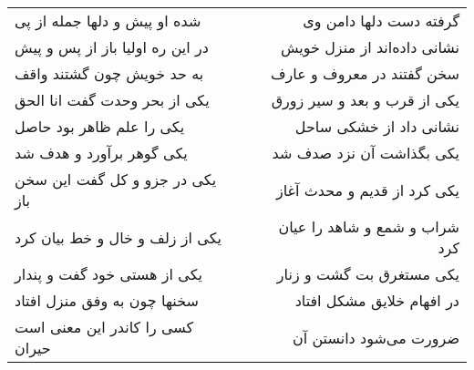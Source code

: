 \begin{center}
\begin{longtable}{l p{0.5cm} r}
شده او پیش و دلها جمله از پی
&&
گرفته دست دلها دامن وی
\\
در این ره اولیا باز از پس و پیش
&&
نشانی داده‌اند از منزل خویش
\\
به حد خویش چون گشتند واقف
&&
سخن گفتند در معروف و عارف
\\
یکی از بحر وحدت گفت انا الحق
&&
یکی از قرب و بعد و سیر زورق
\\
یکی را علم ظاهر بود حاصل
&&
نشانی داد از خشکی ساحل
\\
یکی گوهر برآورد و هدف شد
&&
یکی بگذاشت آن نزد صدف شد
\\
یکی در جزو و کل گفت این سخن باز
&&
یکی کرد از قدیم و محدث آغاز
\\
یکی از زلف و خال و خط بیان کرد
&&
شراب و شمع و شاهد را عیان کرد
\\
یکی از هستی خود گفت و پندار
&&
یکی مستغرق بت گشت و زنار
\\
سخنها چون به وفق منزل افتاد
&&
در افهام خلایق مشکل افتاد
\\
کسی را کاندر این معنی است حیران
&&
ضرورت می‌شود دانستن آن
\\
\end{longtable}
\end{center}
